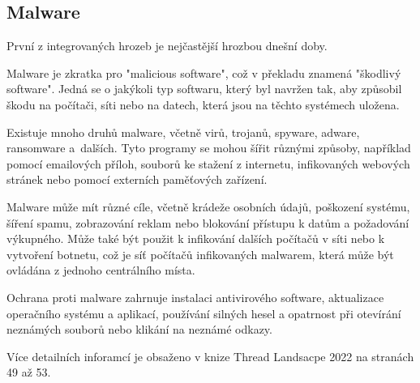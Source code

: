 \subsection{Malware}

První z integrovaných hrozeb je nejčastější hrozbou dnešní doby.

Malware je zkratka pro "malicious software", což v překladu znamená "škodlivý software". Jedná se o jakýkoli typ softwaru, který byl navržen tak, aby způsobil škodu na počítači, síti nebo na datech, která jsou na těchto systémech uložena.

Existuje mnoho druhů malware, včetně virů, trojanů, spyware, adware, ransomware a~dalších. Tyto programy se mohou šířit různými způsoby, například pomocí emailových příloh, souborů ke stažení z internetu, infikovaných webových stránek nebo pomocí externích paměťových zařízení.

Malware může mít různé cíle, včetně krádeže osobních údajů, poškození systému, šíření spamu, zobrazování reklam nebo blokování přístupu k datům a požadování výkupného. Může také být použit k infikování dalších počítačů v síti nebo k vytvoření botnetu, což je síť počítačů infikovaných malwarem, která může být ovládána z jednoho centrálního místa.

Ochrana proti malware zahrnuje instalaci antivirového software, aktualizace operačního systému a aplikací, používání silných hesel a opatrnost při otevírání neznámých souborů nebo klikání na neznámé odkazy.

Více detailních inforamcí je obsaženo v knize Thread Landsacpe 2022 na stranách 49 až 53. \cite{enisa}